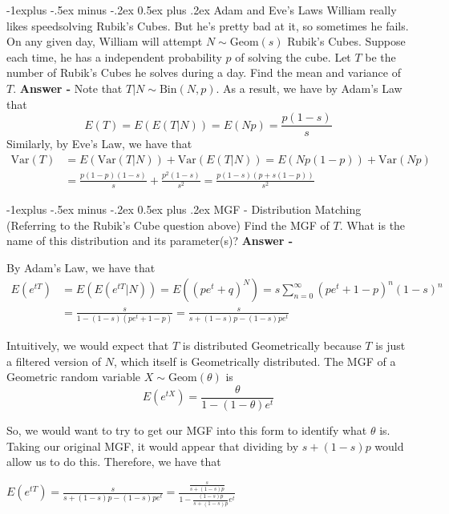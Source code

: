\documentclass[10pt,landscape]{article}
\makeatletter
\newcommand{\var}{\textrm{Var}}
\newcommand{\Bin}{\textrm{Bin}}
\newcommand{\Geom}{\textrm{Geom}}
\renewcommand{\subsection}{\@startsection{subsection}{2}{0mm}%
                                {-1explus -.5ex minus -.2ex}%
                                {0.5ex plus .2ex}%
                                {\normalfont\normalsize\bfseries}}
\makeatother
\begin{document}
\begin{multicols}{3}
\subsection{Adam and Eve's Laws}
William really likes speedsolving Rubik's Cubes. But he's pretty bad at it, so sometimes he fails. On any given day, William will attempt $N \sim \Geom(s)$ Rubik's Cubes. Suppose each time, he has a independent probability $p$ of solving the cube. Let $T$ be the number of Rubik's Cubes he solves during a day. Find the mean and variance of $T$. \textbf{Answer - } Note that $T|N \sim \Bin(N,p)$. As a result, we have by Adam's Law that \[E(T) = E(E(T|N)) = E(Np) = \boxed{\displaystyle\frac {p (1-s)}{s}}\] Similarly, by Eve's Law, we have that \begin{align*}
    \var(T) &= E(\var(T|N)) + \var(E(T|N)) =  E(Np(1-p)) + \var(Np)\\&= \frac{p(1-p)(1-s)}{s} +  \frac{p^2(1-s)}{s^2} = \boxed{\frac{p(1-s)(p+s(1-p))}{s^2}}
    \end{align*}

\subsection{MGF - Distribution Matching}
(Referring to the Rubik's Cube question above) Find the MGF of $T$. What is the name of this distribution and its parameter(s)? \textbf{Answer - }

    By Adam's Law, we have that \begin{align*} E(e^{tT}) &= E(E(e^{tT}|N)) =E((pe^t + q)^N) = s\sum_{n=0}^\infty(pe^t + 1-p)^n(1-s)^n \\&=\frac{s}{1-(1-s)(pe^t+1-p)} =\frac{s}{s+(1-s)p-(1-s)pe^t}
    \end{align*}
    
    Intuitively, we would expect that $T$ is distributed Geometrically because $T$ is just a filtered version of $N$, which itself is Geometrically distributed. The MGF of a Geometric random variable $X\sim\Geom(\theta)$ is \[E(e^{tX}) = \displaystyle\frac{\theta}{1-(1-\theta) e^t}\]
    
    So, we would want to try to get our MGF into this form to identify what $\theta$ is. Taking our original MGF, it would appear that dividing by $s+(1-s)p$ would allow us to do this. Therefore, we have that \begin{center}
    $E(e^{tT}) = \displaystyle\frac{s}{s+(1-s)p - (1-s)pe^t} = \frac{\frac{s}{s+(1-s)p}}{1-\frac{(1-s)p}{s+(1-s)p}e^t}$
    \end{center}
    

\end{multicols}
\end{document}
